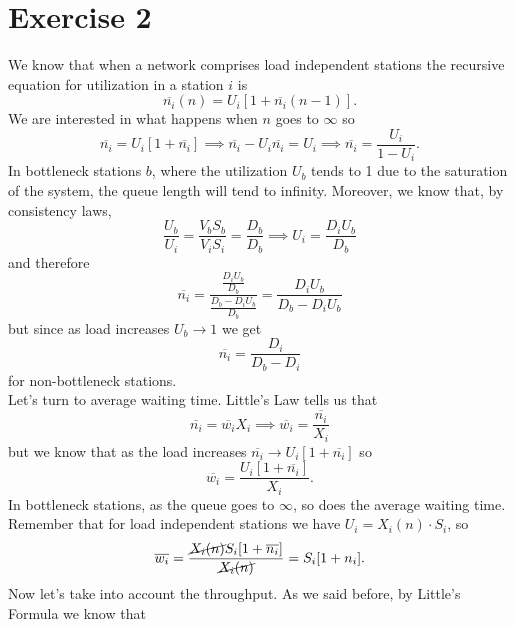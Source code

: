 \documentclass[12pt]{article}
\begin{document}
	\section*{Exercise 2}
	We know that when a network comprises load independent stations the recursive equation for utilization in a station $i$ is
	\begin{equation*}
		\overline{n_{i}}(n)=U_{i}[1+\overline{n_{i}}(n-1)].
	\end{equation*}
	We are interested in what happens when $n$ goes to $\infty$ so
	\begin{equation*}
		\overline{n_{i}}=U_i[1+\overline{n_{i}}]\implies\overline{n_{i}}-U_i\overline{n_{i}}=U_i\implies \overline{n_{i}}=\frac{U_i}{1-U_i}.
	\end{equation*}
	In bottleneck stations $b$, where the utilization $U_b$ tends to 1 due to the saturation of the system, the queue length will tend to infinity.
	Moreover, we know that, by consistency laws,
	\begin{equation*}
		\frac{U_b}{U_i}=\frac{V_bS_b}{V_iS_i}=\frac{D_{b}}{D_b}\implies U_i=\frac{D_iU_b}{D_b}
	\end{equation*}
	and therefore
	\begin{equation*}
		\overline{n_{i}}=\frac{\frac{D_iU_b}{D_b}}{\frac{D_b-D_iU_b}{D_b}}=\frac{D_iU_b}{D_b-D_iU_b}
	\end{equation*}
	but since as load increases $U_b\to1$ we get
	\begin{equation*}
		\overline{n_{i}}=\frac{D_i}{D_b-D_i}
	\end{equation*}
	for non-bottleneck stations.\\
	Let's turn to average waiting time. Little's Law tells us that 
	\begin{equation*}
		\overline{n_{i}}=\overline{w_i}X_i\implies\overline{w_i}=\frac{\overline{n_i}}{X_i}
	\end{equation*}
	but we know that as the load increases $\overline{n_{i}}\to U_i[1+\overline{n_{i}}]$ so 
	\begin{equation*}
		\overline{w_i}=\frac{U_i[1+\overline{n_{i}}]}{X_i}.
	\end{equation*}
	In bottleneck stations, as the queue goes to $\infty$, so does the average waiting time. Remember that for load independent stations we have $U_i=X_i(n)\cdot S_i$, so
	\begin{equation*}
		\overline{w_i}=\frac{\cancel{X_i(n)}S_i[1+\overline{n_{i}}]}{\cancel{X_i(n)}}=S_i[1+n_i].
	\end{equation*}
	Now let's take into account the throughput. As we said before, by Little's Formula we know that 
\end{document}
